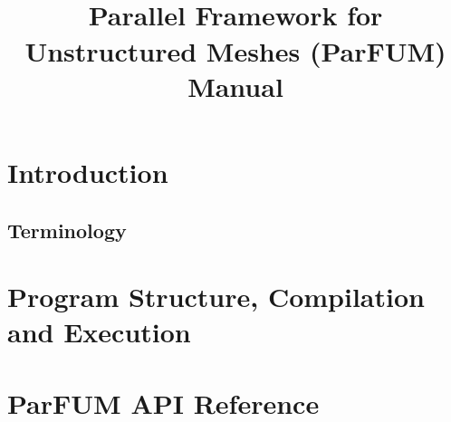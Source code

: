 \documentclass[10pt]{article}
\title{\charmpp\\ Parallel Framework for Unstructured Meshes (ParFUM) Manual}
\begin{document}
\maketitle

\section{Introduction}
\label{sec:intro}


\subsection{Terminology}
\label{sec:terminology}


\section{Program Structure, Compilation and Execution}
\label{sec:program}


\section{ParFUM API Reference}
\label{sec:api}



\end{document}
